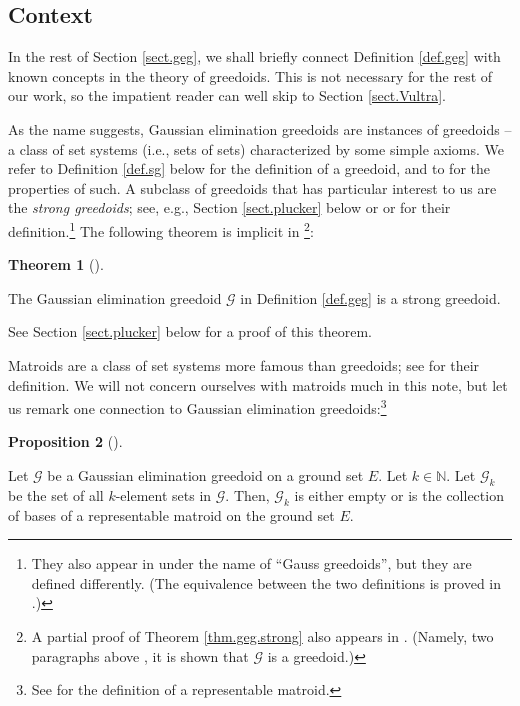 \documentclass[numbers=enddot,12pt,final,onecolumn,notitlepage]{scrartcl}%
\theoremstyle{definition}
\newtheorem{theo}{Theorem}[section]
\newenvironment{theorem}[1][]
{\begin{theo}[#1]\begin{leftbar}}
{\end{leftbar}\end{theo}}
\newtheorem{prop}[theo]{Proposition}
\newenvironment{proposition}[1][]
{\begin{prop}[#1]\begin{leftbar}}
{\end{leftbar}\end{prop}}
\theoremstyle{plainsl}
\begin{document}
\subsection{Context}

In the rest of Section \ref{sect.geg}, we shall briefly connect Definition
\ref{def.geg} with known concepts in the theory of greedoids. This is not
necessary for the rest of our work, so the impatient reader can well skip to
Section \ref{sect.Vultra}.

As the name suggests, Gaussian elimination greedoids are instances of
greedoids -- a class of set systems (i.e., sets of sets) characterized by some
simple axioms. We refer to Definition \ref{def.sg} below for the definition of
a greedoid, and to \cite{KoLoSc91} for the properties of such. A subclass of
greedoids that has particular interest to us are the \textit{strong
greedoids}; see, e.g., Section \ref{sect.plucker} below or \cite[\S 6.1]%
{GriPet19} or \cite[\S 2]{BrySha99} for their definition.\footnote{They also
appear in \cite[\S IX.4]{KoLoSc91} under the name of \textquotedblleft Gauss
greedoids\textquotedblright, but they are defined differently. (The
equivalence between the two definitions is proved in \cite[\S 2]{BrySha99}.)}
The following theorem is implicit in \cite[\S IX.4]{KoLoSc91}\footnote{A
partial proof of Theorem \ref{thm.geg.strong} also appears in \cite[\S 1.3]%
{Knapp18}. (Namely, two paragraphs above \cite[Example 1.3.15]{Knapp18}, it is
shown that $\mathcal{G}$ is a greedoid.)}:

\begin{theorem}
\label{thm.geg.strong}The Gaussian elimination greedoid $\mathcal{G}$ in
Definition \ref{def.geg} is a strong greedoid.
\end{theorem}

See Section \ref{sect.plucker} below for a proof of this theorem.

Matroids are a class of set systems more famous than greedoids; see
\cite{Oxley11} for their definition. We will not concern ourselves with
matroids much in this note, but let us remark one connection to Gaussian
elimination greedoids:\footnote{See \cite[\S 1.1]{Oxley11} for the definition
of a representable matroid.}

\begin{proposition}
\label{prop.geg.matroid-rep}Let $\mathcal{G}$ be a Gaussian elimination
greedoid on a ground set $E$. Let $k\in\mathbb{N}$. Let $\mathcal{G}_{k}$ be
the set of all $k$-element sets in $\mathcal{G}$. Then, $\mathcal{G}_{k}$ is
either empty or is the collection of bases of a representable matroid on the
ground set $E$.
\end{proposition}
\end{document}
